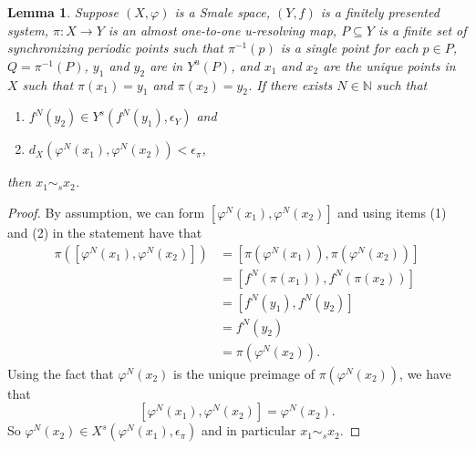 \documentclass{amsart}
\newcommand{\N}{\mathbb{N}}
\theoremstyle{plain}
\newtheorem{lemma}[theorem]{Lemma}
\theoremstyle{definition}
\theoremstyle{remark}
\begin{document}
\begin{lemma} \label{lem:closeImpliesStable}
Suppose $(X, \varphi)$ is a Smale space, $(Y, f)$ is a finitely presented system, $\pi: X \rightarrow Y$ is an almost one-to-one u-resolving map, $P \subseteq Y$ is a finite set of synchronizing periodic points such that $\pi^{-1}(p)$ is a single point for each $p\in P$, $Q=\pi^{-1}(P)$, $y_1$ and $y_2$ are in $Y^u(P)$, and $x_1$ and $x_2$ are the unique points in $X$ such that $\pi(x_1)=y_1$ and $\pi(x_2)=y_2$. If there exists $N\in \N$ such that
\begin{enumerate}
\item $f^N(y_2) \in Y^s(f^N(y_1), \epsilon_Y)$ and
\item $d_X(\varphi^N(x_1), \varphi^N(x_2)) < \epsilon_{\pi}$,
\end{enumerate}
then $x_1 \sim_s x_2$.
\end{lemma}
\begin{proof}
By assumption, we can form $[ \varphi^N(x_1), \varphi^N(x_2) ]$ and using items (1) and (2) in the statement have that
\begin{align*}
\pi( [ \varphi^N(x_1), \varphi^N(x_2) ])  & = [ \pi(\varphi^N(x_1)), \pi(\varphi^N(x_2))] \\
& = [ f^N(\pi(x_1)), f^N(\pi(x_2))] \\
& = [ f^N(y_1), f^N(y_2) ] \\
& = f^N(y_2) \\
& = \pi(\varphi^N(x_2)).
\end{align*}
Using the fact that $\varphi^N(x_2)$ is the unique preimage of $\pi(\varphi^N(x_2))$, we have that
\[ [ \varphi^N(x_1), \varphi^N(x_2) ] = \varphi^N(x_2). \]
So $\varphi^N(x_2) \in X^s(\varphi^N(x_1), \epsilon_{\pi})$ and in particular $x_1 \sim_s x_2$.
\end{proof}
\end{document}
